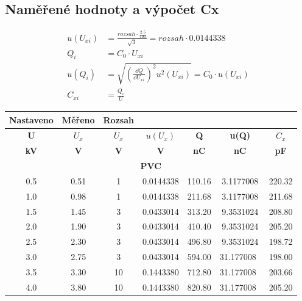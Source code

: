 \documentclass[titlepage]{article}
\begin{document}
    		\subsection{Naměřené hodnoty a výpočet Cx}
    			\begin{align*}
    				u(U_{xi}) &= \frac{rozsah \cdot \frac{2.5}{100}}{\sqrt{3}} = rozsah \cdot 0.0144338\\
    				Q_i &= C_0 \cdot U_{xi}\\
    				u(Q_i) &= \sqrt{(\frac{\dd{Q}}{\dd{U_{xi}}})^2u^2(U_{xi})} = C_0 \cdot u(U_{xi})\\
    				C_{xi} &= \frac{Q_i}{U}
    			\end{align*}
\begin{tabular}{|c|c|c|c|c|c|c|} 
\hline
\textbf{Nastaveno} & \textbf{Měřeno} & \textbf{Rozsah} &            &             &               &              \\ 
\hline
\textbf{ U }       & $U_x$           & $U_x$           & $u(U_x)$   & \textbf{Q}  & \textbf{u(Q)} & $C_x$        \\ 
\hline
\textbf{ kV }      & \textbf{V }     & \textbf{V }     & \textbf{V} & \textbf{nC} & \textbf{nC}   & \textbf{pF}  \\ 
\hline\hline
\multicolumn{7}{|c|}{\textbf{PVC}}                                                                               \\ 
\hline\hline
0.5                & 0.51            & 1               & 0.0144338  & 110.16      & 3.1177008     & 220.32       \\ 
\hline
1.0                & 0.98            & 1               & 0.0144338  & 211.68      & 3.1177008     & 211.68       \\ 
\hline
1.5                & 1.45            & 3               & 0.0433014  & 313.20      & 9.3531024     & 208.80       \\ 
\hline
2.0                & 1.90            & 3               & 0.0433014  & 410.40      & 9.3531024     & 205.20       \\ 
\hline
2.5                & 2.30            & 3               & 0.0433014  & 496.80      & 9.3531024     & 198.72       \\ 
\hline
3.0                & 2.75            & 3               & 0.0433014  & 594.00      & 31.177008~    & 198.00       \\ 
\hline
3.5                & 3.30            & 10              & 0.1443380  & 712.80      & 31.177008~    & 203.66       \\ 
\hline
4.0                & 3.80            & 10              & 0.1443380  & 820.80      & 31.177008~    & 205.20       \\ 

\end{tabular}
\end{document}
